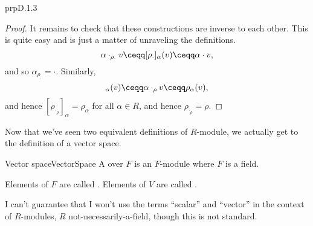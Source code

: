 \begin{thm}{}{prpD.1.3}
\begin{proof}
\blankline
\noindent
It remains to check that these constructions are inverse to each other.  This is quite easy and is just a matter of unraveling the definitions.
\begin{equation}
\alpha \cdot _{\rho _{\cdot}}v\ceqq [\rho _{\cdot}]_{\alpha}(v)\ceqq \alpha \cdot v,
\end{equation}
and so $\alpha _{\rho _{\cdot}}=\cdot$.  Similarly,
\begin{equation}
[\rho _{\cdot _{\rho}}]_{\alpha}(v)\ceqq \alpha \cdot _{\rho}v\ceqq \rho _{\alpha}(v),
\end{equation}
and hence $[\rho _{\cdot _{\rho}}]_{\alpha}=\rho _{\alpha}$ for all $\alpha \in R$, and hence $\rho _{\cdot _{\rho}}=\rho$.
\end{proof}
\end{thm}
Now that we've seen two equivalent definitions of $R$-module, we actually get to the definition of a vector space.
\begin{dfn}{Vector space}{VectorSpace}
A  over $F$ is an $F$-module where $F$ is a field.
\begin{rmk}
Elements of $F$ are called .  Elements of $V$ are called .
\end{rmk}
\begin{rmk}
I can't guarantee that I won't use the terms ``scalar'' and ``vector'' in the context of $R$-modules, $R$ not-necessarily-a-field, though this is not standard.
\end{rmk}
\end{dfn}

